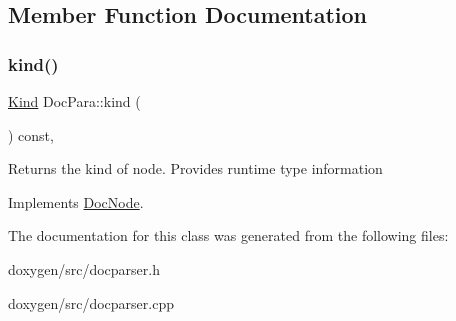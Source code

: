 \subsection{Member Function Documentation}
\mbox{\label{class_doc_para_acd2786d8d5acf861524a60efd2bf4eba}} 
\subsubsection{\texorpdfstring{kind()}{kind()}}
{\footnotesize\ttfamily \mbox{\hyperlink{class_doc_node_aebd16e89ca590d84cbd40543ea5faadb}{Kind}} Doc\+Para\+::kind (\begin{DoxyParamCaption}{ }\end{DoxyParamCaption}) const\hspace{0.3cm}{\ttfamily [inline]}, {\ttfamily [virtual]}}

Returns the kind of node. Provides runtime type information 

Implements \mbox{\hyperlink{class_doc_node_a108ffd214a72ba6e93dac084a8f58049}{Doc\+Node}}.



The documentation for this class was generated from the following files\+:\begin{DoxyCompactItemize}
\item 
doxygen/src/docparser.\+h\item 
doxygen/src/docparser.\+cpp\end{DoxyCompactItemize}
